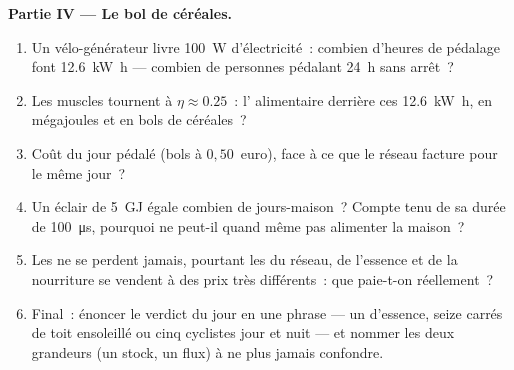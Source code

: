 \begin{problem}
\medskip
\noindent\textbf{Partie IV --- Le bol de céréales.}
\begin{enumerate}[resume]
  \item Un vélo-générateur livre \qty{100}{W} d'électricité~: combien
        d'heures de pédalage font \qty{12.6}{kW.h} --- combien de
        personnes pédalant \qty{24}{h} sans arrêt~?
  \item Les muscles tournent à $\eta \approx 0.25$~: l'
        alimentaire derrière ces \qty{12.6}{kW.h}, en mégajoules et en
        bols de céréales~?
  \item Coût du jour pédalé (bols à $0{,}50$~euro), face à ce que le
        réseau facture pour le même jour~?
  \item Un éclair de \qty{5}{GJ} égale combien de jours-maison~? Compte
        tenu de sa durée de \qty{100}{\micro s}, pourquoi ne peut-il
        quand même pas alimenter la maison~?
  \item Les  ne se perdent jamais, pourtant les
         du réseau, de l'essence et de la
        nourriture se vendent à des prix très différents~: que
        paie-t-on réellement~?
  \item Final~: énoncer le verdict du jour en une phrase --- un
         d'essence, seize
         carrés de toit ensoleillé ou cinq cyclistes
        jour et nuit --- et nommer les deux grandeurs (un stock, un
        flux) à ne plus jamais confondre.
\end{enumerate}
\end{problem}

